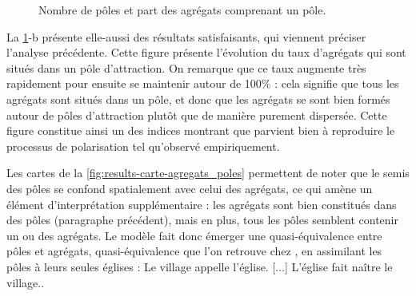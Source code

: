 \begin{figure}[H]
	\centering
	\hspace{5pt}
	\caption[Nombre de pôles et part des agrégats comprenant un pôle.]{Nombre de pôles et part des agrégats comprenant un pôle.}
	\label{fig:results-nb-poles-agregats}
\end{figure}

La \cref{fig:results-nb-poles-agregats}-b présente elle-aussi des résultats satisfaisants, qui viennent préciser l'analyse précédente.
Cette figure présente l'évolution du taux d'agrégats qui sont situés dans un pôle d'attraction.
On remarque que ce taux augmente très rapidement pour ensuite se maintenir autour de 100\% : cela signifie que tous les agrégats sont situés dans un pôle, et donc que les agrégats se sont bien formés autour de pôles d'attraction plutôt que de manière purement dispersée.
Cette figure constitue ainsi un des indices montrant que \simfeodal{} parvient bien à reproduire le processus de polarisation tel qu'observé empiriquement.

Les cartes de la \cref{fig:results-carte-agregats_poles} permettent de noter que le semis des pôles se confond spatialement avec celui des agrégats, ce qui amène un élément d'interprétation supplémentaire : les agrégats sont bien constitués dans des pôles (paragraphe précédent), mais en plus, tous les pôles semblent contenir un ou des agrégats.
Le modèle fait donc émerger une quasi-équivalence entre pôles et agrégats, quasi-équivalence que l'on retrouve chez \textcite[27-28]{le1976eglise}, en assimilant les pôles à leurs seules églises : \og Le village appelle l'église. [...] L'église fait naître le village.\fg{}.

